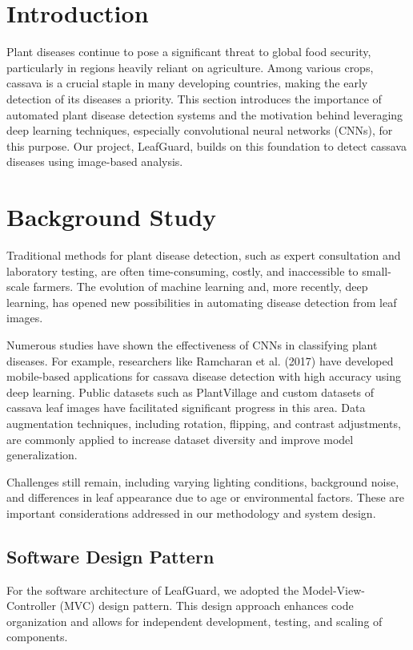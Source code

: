 \section{Introduction}
Plant diseases continue to pose a significant threat to global food security, particularly in regions heavily reliant on agriculture. Among various crops, cassava is a crucial staple in many developing countries, making the early detection of its diseases a priority. This section introduces the importance of automated plant disease detection systems and the motivation behind leveraging deep learning techniques, especially convolutional neural networks (CNNs), for this purpose. Our project, LeafGuard, builds on this foundation to detect cassava diseases using image-based analysis.

\section{Background Study}
Traditional methods for plant disease detection, such as expert consultation and laboratory testing, are often time-consuming, costly, and inaccessible to small-scale farmers. The evolution of machine learning and, more recently, deep learning, has opened new possibilities in automating disease detection from leaf images.

Numerous studies have shown the effectiveness of CNNs in classifying plant diseases. For example, researchers like Ramcharan et al. (2017) have developed mobile-based applications for cassava disease detection with high accuracy using deep learning. Public datasets such as PlantVillage and custom datasets of cassava leaf images have facilitated significant progress in this area. Data augmentation techniques, including rotation, flipping, and contrast adjustments, are commonly applied to increase dataset diversity and improve model generalization.

Challenges still remain, including varying lighting conditions, background noise, and differences in leaf appearance due to age or environmental factors. These are important considerations addressed in our methodology and system design.

\subsection{Software Design Pattern}
For the software architecture of LeafGuard, we adopted the Model-View-Controller (MVC) design pattern. This design approach enhances code organization and allows for independent development, testing, and scaling of components.

